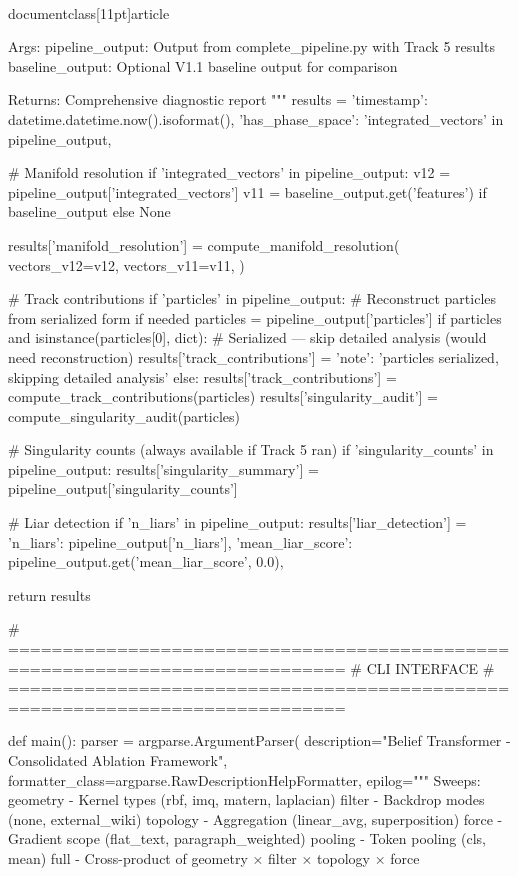 \\documentclass[11pt]{article}
\begin{document}
\begin{CodeBlock}
    Args:
        pipeline_output: Output from complete_pipeline.py with Track 5 results
        baseline_output: Optional V1.1 baseline output for comparison

    Returns:
        Comprehensive diagnostic report
    """
    results = {
        'timestamp': datetime.datetime.now().isoformat(),
        'has_phase_space': 'integrated_vectors' in pipeline_output,
    }

    # Manifold resolution
    if 'integrated_vectors' in pipeline_output:
        v12 = pipeline_output['integrated_vectors']
        v11 = baseline_output.get('features') if baseline_output else None

        results['manifold_resolution'] = compute_manifold_resolution(
            vectors_v12=v12,
            vectors_v11=v11,
        )

    # Track contributions
    if 'particles' in pipeline_output:
        # Reconstruct particles from serialized form if needed
        particles = pipeline_output['particles']
        if particles and isinstance(particles[0], dict):
            # Serialized — skip detailed analysis (would need reconstruction)
            results['track_contributions'] = {'note': 'particles serialized, skipping detailed analysis'}
        else:
            results['track_contributions'] = compute_track_contributions(particles)
            results['singularity_audit'] = compute_singularity_audit(particles)

    # Singularity counts (always available if Track 5 ran)
    if 'singularity_counts' in pipeline_output:
        results['singularity_summary'] = pipeline_output['singularity_counts']

    # Liar detection
    if 'n_liars' in pipeline_output:
        results['liar_detection'] = {
            'n_liars': pipeline_output['n_liars'],
            'mean_liar_score': pipeline_output.get('mean_liar_score', 0.0),
        }

    return results


# =============================================================================
# CLI INTERFACE
# =============================================================================

def main():
    parser = argparse.ArgumentParser(
        description="Belief Transformer - Consolidated Ablation Framework",
        formatter_class=argparse.RawDescriptionHelpFormatter,
        epilog="""
Sweeps:
  geometry   - Kernel types (rbf, imq, matern, laplacian)
  filter     - Backdrop modes (none, external_wiki)
  topology   - Aggregation (linear_avg, superposition)
  force      - Gradient scope (flat_text, paragraph_weighted)
  pooling    - Token pooling (cls, mean)
  full       - Cross-product of geometry × filter × topology × force


\end{CodeBlock}
\end{document}
